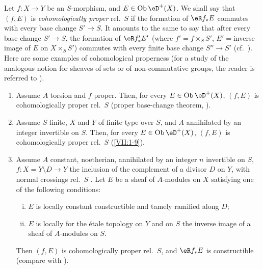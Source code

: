 Let $f:X\to Y$ be an $S$-morphism, and $E\in\ob\eD^+(X)$. We shall say that
$(f,E)$ is \emph{cohomologically proper} rel.\ $S$ if the formation of
$\eR f_\ast E$ commutes with every base change $S'\to S$. It amounts to the
same to say that after every base change $S'\to S$, the formation of
$\eR f_\ast' E'$ (where $f'=f\times_S S'$, $E'=$inverse image of $E$ on
$X\times_S S'$) commutes with every finite base change $S'' \to S'$ (cf.\
\cite[XII 6.1]{sga4}). Here are some examples of cohomological properness
(for a study of the analogous notion for sheaves of sets or of
non-commutative groups, the reader is referred to \cite[XIII]{sga1}).
\begin{enumerate} %
  \item Assume $A$ torsion and $f$ proper. Then, for every
    $E\in\ob\eD^+(X)$, $(f,E)$ is cohomologically proper rel.\ $S$
    (proper base-change theorem, \cite[XII 5.1]{sga4}).
  \item Assume $S$ finite, $X$ and $Y$ of finite type over $S$, and $A$ annihilated
    by an integer invertible on $S$. Then, for every $E\in\ob\eD^+(X)$,
    $(f,E)$ is cohomologically proper rel.\ $S$
    (\ref{VII:1-9}).
  \item Assume $A$ constant, noetherian, annihilated by an integer $n$
    invertible on $S$, $f:X=Y\setminus D\to Y$ the inclusion of the complement
    of a divisor $D$ on $Y$, with normal crossings rel.\ $S$
    \cite[XIII 2.1]{sga1}. Let $E$ be a sheaf of $A$-modules on $X$
    satisfying one of the following conditions:
    \begin{enumerate}[(i)]
      \item $E$ is locally constant constructible and tamely
        ramified along $D$;
      \item $E$ is locally for the \'etale topology on $Y$ and on $S$
        the inverse image of a sheaf of $A$-modules on $S$.
    \end{enumerate}
    Then $(f,E)$ is cohomologically proper rel.\ $S$, and $\eR f_\ast E$ is
    constructible (compare with \cite[XIII 2.4]{sga1}).
\end{enumerate}

